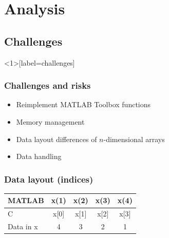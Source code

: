 \section{Analysis}

\subsection{Challenges}
\begin{frame}<1>[label=challenges]\frametitle{Challenges and risks}
\begin{itemize}
	\item<1> Reimplement MATLAB Toolbox functions
	\item<2> Memory management
	\item<3> Data layout differences of $n$-dimensional arrays
	\item<4> Data handling
\end{itemize}
\end{frame}

\begin{frame}\frametitle{Data layout (indices)}
	\centering
	\begin{tabular}{|l|c|c|c|c|}
	\hline
	MATLAB    & \cellcolor{langM} x(1) & \cellcolor{langM} x(2) & \cellcolor{langM} x(3) & \cellcolor{langM} x(4) \\ \hline
	C         & \cellcolor{langC} x[0] & \cellcolor{langC} x[1] & \cellcolor{langC} x[2] & \cellcolor{langC} x[3] \\ \hline
	Data in x & \cellcolor{data} 4     & \cellcolor{data} 3     & \cellcolor{data} 2     & \cellcolor{data} 1     \\ \hline
	\end{tabular}
\end{frame}

